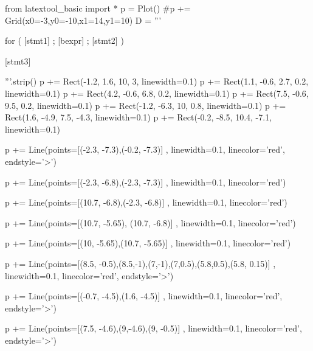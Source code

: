 

\begin{python}
from latextool_basic import *
p = Plot()
#p += Grid(x0=-3,y0=-10,x1=14,y1=10)
D = '''





for ( [stmt1] ;         [bexpr]   ;    [stmt2]  )










            [stmt3]







'''.strip()
p += Rect(-1.2, 1.6, 10, 3, linewidth=0.1)
p += Rect(1.1, -0.6, 2.7, 0.2, linewidth=0.1)
p += Rect(4.2, -0.6, 6.8, 0.2, linewidth=0.1)
p += Rect(7.5, -0.6, 9.5, 0.2, linewidth=0.1)
p += Rect(-1.2, -6.3, 10, 0.8, linewidth=0.1)
p += Rect(1.6, -4.9, 7.5, -4.3, linewidth=0.1)
p += Rect(-0.2, -8.5, 10.4, -7.1, linewidth=0.1)

p += Line(points=[(-2.3, -7.3),(-0.2, -7.3)] , linewidth=0.1, linecolor='red', endstyle='>')

p += Line(points=[(-2.3, -6.8),(-2.3, -7.3)] , linewidth=0.1, linecolor='red')

p += Line(points=[(10.7, -6.8),(-2.3, -6.8)] , linewidth=0.1, linecolor='red')

p += Line(points=[(10.7, -5.65), (10.7, -6.8)] , linewidth=0.1, linecolor='red')

p += Line(points=[(10, -5.65),(10.7, -5.65)] , linewidth=0.1, linecolor='red')

p += Line(points=[(8.5, -0.5),(8.5,-1),(7,-1),(7,0.5),(5.8,0.5),(5.8, 0.15)] , linewidth=0.1, linecolor='red', endstyle='>')

p += Line(points=[(-0.7, -4.5),(1.6, -4.5)] , linewidth=0.1, linecolor='red', endstyle='>')

p += Line(points=[(7.5, -4.6),(9,-4.6),(9, -0.5)] , linewidth=0.1, linecolor='red', endstyle='>')


\end{python}

